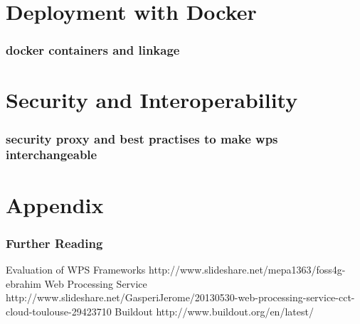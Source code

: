 \documentclass{beamer}
\begin{document}
  \section{Deployment with Docker}

  \begin{frame}
    \frametitle{docker containers and linkage}
  \end{frame}


  \section{Security and Interoperability}

  \begin{frame}
    \frametitle{security proxy and best practises to make wps interchangeable}
  \end{frame}

  \appendix

  \section{Appendix}
  
   \begin{frame}[allowframebreaks]
    \frametitle<presentation>{Further Reading}    
    \begin{thebibliography}{10}    
      \beamertemplatearticlebibitems
      Evaluation of WPS Frameworks
      \newblock http://www.slideshare.net/mepa1363/foss4g-ebrahim
      Web Processing Service
      \newblock http://www.slideshare.net/GasperiJerome/20130530-web-processing-service-cct-cloud-toulouse-29423710
      Buildout
      \newblock http://www.buildout.org/en/latest/
    \end{thebibliography}
    
  \end{frame}
  
\end{document}
